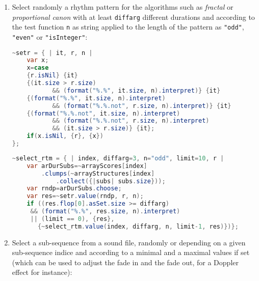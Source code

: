 \begin{enumerate}
    \item Select randomly a rhythm pattern for the algorithms such as \textsl{fractal} or \textsl{proportional canon} with at least \texttt{diffarg} different durations and according to the test function \texttt{n} as string applied to the length of the pattern as \texttt{"odd"}, \texttt{"even"} or \texttt{"isInteger"}:
    
    \smallskip
    
\begin{lstlisting}[basicstyle=\footnotesize\ttfamily,language=Java]
~setr = { | it, r, n |
	var x;
	x=case
	{r.isNil} {it}
	{(it.size > r.size) 
           && (format("%.%", it.size, n).interpret)} {it}
	{(format("%.%", it.size, n).interpret) 
           && (format("%.%.not", r.size, n).interpret)} {it}
	{(format("%.%.not", it.size, n).interpret) 
           && (format("%.%.not", r.size, n).interpret) 
           && (it.size > r.size)} {it};
	if(x.isNil, {r}, {x}) 
};
\end{lstlisting}  
\begin{lstlisting}[basicstyle=\footnotesize\ttfamily,language=Java]	
~select_rtm = { | index, diffarg=3, n="odd", limit=10, r |
	var arDurSubs=~arrayScores[index]
	    .clumps(~arrayStructures[index]
            .collect({|subs| subs.size}));
	var rndp=arDurSubs.choose;
	var res=~setr.value(rndp, r, n);
	if ((res.flop[0].asSet.size >= diffarg) 
	 && (format("%.%", res.size, n).interpret) 
	 || (limit == 0), {res}, 
       {~select_rtm.value(index, diffarg, n, limit-1, res)})};
\end{lstlisting}  
 \item Select a sub-sequence from a sound file, randomly or depending on a given sub-sequence indice and according to a minimal and a maximal values if set (which can be used to adjust the fade in and the fade out, for a Doppler effect for instance):
 
 \smallskip
 

\end{enumerate}
